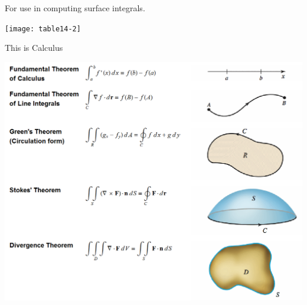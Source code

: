 \documentclass[12pt]{beamer}
\theoremstyle{plain}
\theoremstyle{definition}
\begin{document}
% 
\begin{frame}
\begin{center}
For use in computing surface integrals.
\vspace{0.5pc}

\texttt{[image: table14-2]}
\end{center}
\end{frame}

% 
\begin{frame}
\begin{center}
This is Calculus
\vspace{0.5pc}

\includegraphics[scale=.5]{fundamentalTheorems}
\end{center}
\end{frame}
\end{document}
